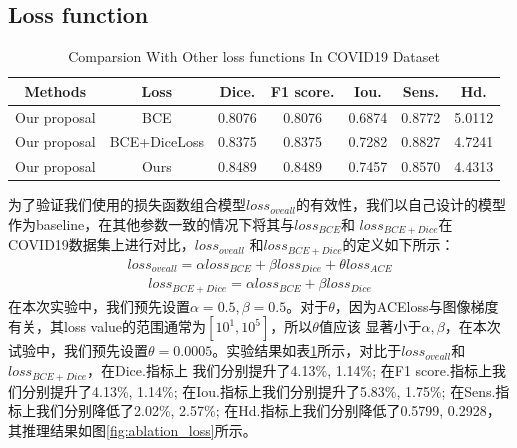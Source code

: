 \documentclass{ieeeaccess}
\begin{document}
  \subsection{Loss function}
  \begin{table}[htbp]
    \vspace{-2mm}
    \begin{center}\small
        \label{loss-table}
        \begin{tabular}{ccccccc}
            \toprule
            Methods & Loss & Dice. & F1 score. & Iou. & Sens. & Hd.\\
            \midrule
            Our proposal & BCE          & 0.8076 & 0.8076 & 0.6874 & 0.8772 & 5.0112\\
            Our proposal & BCE+DiceLoss & 0.8375 & 0.8375 & 0.7282 & 0.8827 & 4.7241\\
            Our proposal & Ours         & 0.8489 & 0.8489 & 0.7457 & 0.8570 & 4.4313\\
        \bottomrule    
        \end{tabular}


        \caption{Comparsion With Other loss functions In COVID19\cite{covid19} Dataset}
    \end{center}
    \vspace{-4mm}
  \end{table}
  为了验证我们使用的损失函数组合模型\(loss_{oveall}\)的有效性，我们以自己设计的模型作为baseline，在其他参数一致的情况下将其与\(loss_{BCE}\)和
  \(loss_{BCE+Dice}\)在COVID19数据集上进行对比，\(loss_{oveall}\)
  和\(loss_{BCE+Dice}\)的定义如下所示：
  \begin{align}
    loss_{oveall} = \alpha loss_{BCE} + \beta loss_{Dice} + \theta loss_{ACE}
  \end{align}
  \begin{align}
    loss_{BCE+Dice} = \alpha loss_{BCE} + \beta loss_{Dice}
  \end{align}
  在本次实验中，我们预先设置\(\alpha=0.5, \beta=0.5\)。对于\(\theta\)，因为ACEloss与图像梯度有关，其loss value的范围通常为\([10^1, 10^5]\)，所以\(\theta\)值应该
  显著小于\(\alpha, \beta\)，在本次试验中，我们预先设置\(\theta=0.0005\)。实验结果如表\ref{loss-table}所示，对比于\(loss_{oveall}\)和\(loss_{BCE+Dice}\)，在Dice.指标上
  我们分别提升了4.13\%, 1.14\%; 在F1 score.指标上我们分别提升了4.13\%, 1.14\%; 在Iou.指标上我们分别提升了5.83\%, 1.75\%; 在Sens.指标上我们分别降低了2.02\%, 2.57\%;
  在Hd.指标上我们分别降低了0.5799, 0.2928，其推理结果如图\ref{fig:ablation_loss}所示。
\end{document}
